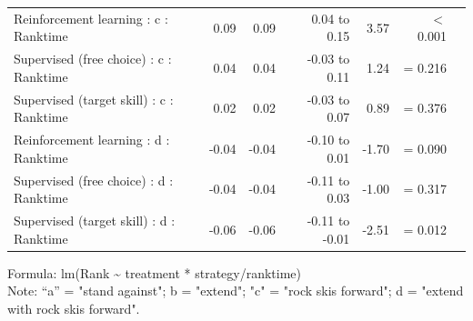 \documentclass{article}
\begin{document}
\begin{longtable}{lrrrrrl}
Reinforcement learning : c : Ranktime & 0.09 & 0.09 & 0.04 to 0.15 & 3.57 &  $<$  0.001 \\ 
Supervised (free choice) : c : Ranktime & 0.04 & 0.04 & -0.03 to 0.11 & 1.24 &  =  0.216 \\ 
Supervised (target skill) : c : Ranktime & 0.02 & 0.02 & -0.03 to 0.07 & 0.89 &  =  0.376 \\ 
Reinforcement learning : d : Ranktime & -0.04 & -0.04 & -0.10 to 0.01 & -1.70 &  =  0.090 \\ 
Supervised (free choice) : d : Ranktime & -0.04 & -0.04 & -0.11 to 0.03 & -1.00 &  =  0.317 \\ 
Supervised (target skill) : d : Ranktime & -0.06 & -0.06 & -0.11 to -0.01 & -2.51 &  =  0.012 \\ 
\bottomrule
\end{longtable}
\begin{minipage}{\linewidth}
Formula: lm(Rank \textasciitilde{} treatment * strategy/ranktime)\\
Note: “a” = "stand against"; b = "extend"; "c" = "rock skis forward"; d = "extend with rock skis forward". 
\end{minipage}
\end{document}
